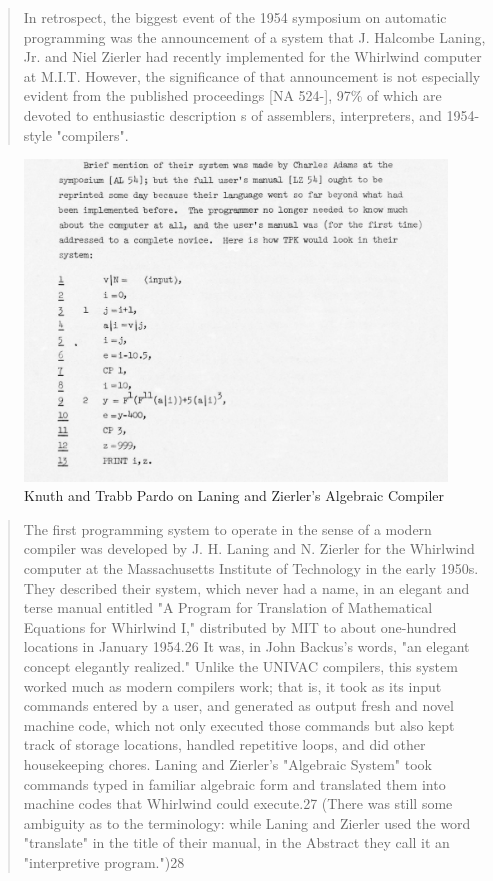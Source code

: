 \begin{quotation}
  In retrospect, the biggest event of the 1954 symposium on automatic
  programming
  was the announcement of a system that J. Halcombe Laning, Jr. and Niel Zierler
  had recently implemented for the Whirlwind computer at M.I.T.  However, the
  significance of that announcement is not especially evident from the published
  proceedings [NA 524-], 97\% of which are devoted to enthusiastic description s
  of assemblers, interpreters, and 1954-style "compilers".
  \cite{Knuth_TrabbPardo_1976_Early_Development}
\end{quotation}

\begin{figure}[h!]
  \centering
  \includegraphics[width=0.5\linewidth]{resource/knuth_pardo_on_laning_zierlers_algebraic_compiler.png}
  \caption{Knuth and Trabb Pardo on Laning and Zierler's Algebraic Compiler}
  \label{fig:knuth-pardo-on-laning-zierler}
\end{figure}

\begin{quotation}
  The first programming system to operate in the sense of a modern compiler was
  developed by J. H. Laning and N. Zierler for the Whirlwind computer at the
  Massachusetts Institute of Technology in the early 1950s. They described their
  system, which never had a name, in an elegant and terse manual entitled "A
  Program for Translation of Mathematical Equations for Whirlwind I,"
  distributed
  by MIT to about one-hundred locations in January 1954.26 It was, in John
  Backus's words, "an elegant concept elegantly realized." Unlike the UNIVAC
  compilers, this system worked much as modern compilers work; that is, it took
  as its input commands entered by a user, and generated as output fresh and
  novel machine code, which not only executed those commands but also kept track
  of storage locations, handled repetitive loops, and did other housekeeping
  chores. Laning and Zierler's "Algebraic System" took commands typed
  in familiar
  algebraic form and translated them into machine codes that Whirlwind could
  execute.27 (There was still some ambiguity as to the terminology: while Laning
    and Zierler used the word "translate" in the title of their manual, in the
  Abstract they call it an "interpretive program.")28
  \cite{new-history-of-modern-computing}
\end{quotation}

